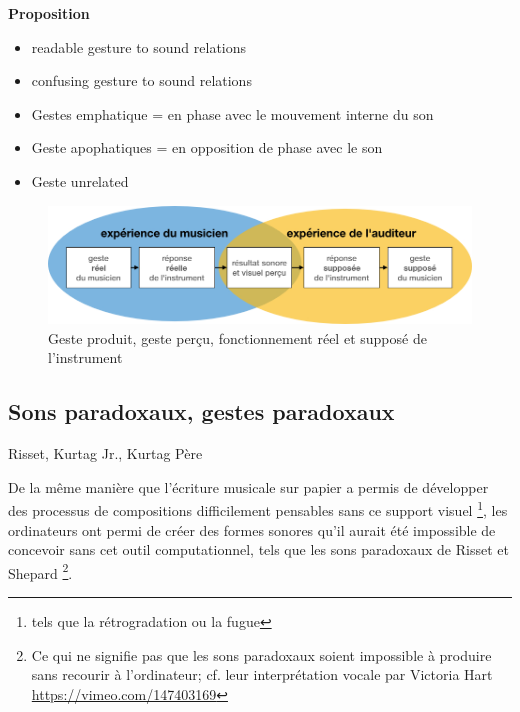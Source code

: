 \textbf{Proposition}
\vspace{-1em}
\begin{itemize}[noitemsep]
\item readable gesture to sound relations
\item confusing gesture to sound relations
\end{itemize}

\vspace{-1em}
\begin{itemize}[noitemsep]
\item Gestes emphatique = en phase avec le mouvement interne du son
\item Geste apophatiques = en opposition de phase avec le son
\item Geste unrelated
\end{itemize}

\begin{figure}[!htbp]
	\captionsetup{format=plain}%
	\includegraphics[width=\textwidth]{gfx/03_gesture/gesteReelGesteSuppose.jpg}
	\caption{Geste produit, geste perçu, fonctionnement réel et supposé de l'instrument}
	\label{fig:gesture:RealVsSupposed}
\end{figure}


\subsection{Sons paradoxaux, gestes paradoxaux}
Risset, Kurtag Jr., Kurtag Père

De la même manière que l'écriture musicale sur papier a permis de développer des processus de compositions difficilement pensables sans ce support visuel \footnote{tels que la rétrogradation ou la fugue}, les ordinateurs ont permi de créer des formes sonores qu'il aurait été impossible de concevoir sans cet outil computationnel, tels que les sons paradoxaux de Risset et Shepard \footnote{Ce qui ne signifie pas que les sons paradoxaux soient impossible à produire sans recourir à l'ordinateur; cf. leur interprétation vocale par Victoria Hart \url{https://vimeo.com/147403169}}.

